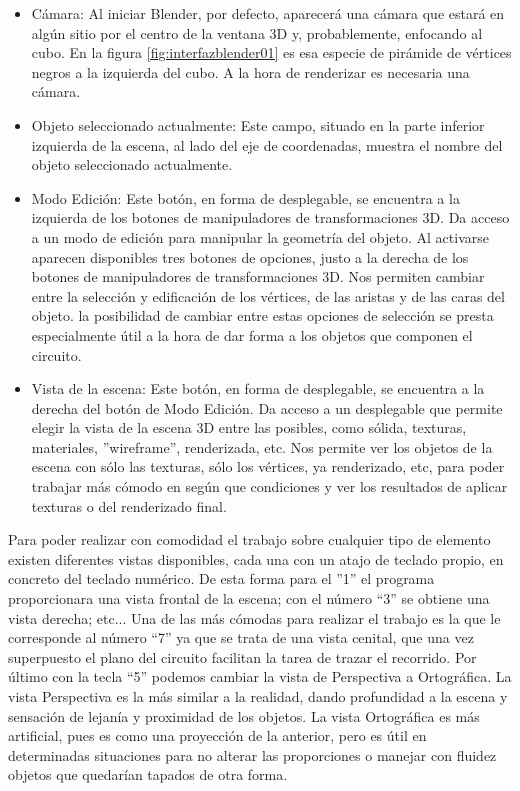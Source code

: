 \begin{itemize}
	\item Cámara: Al iniciar Blender, por defecto, aparecerá una cámara que estará en algún sitio por el centro de la ventana 3D y, probablemente, enfocando al cubo. En la figura \ref{fig:interfazblender01} es esa especie de pirámide de vértices negros a la izquierda del cubo. A la hora de renderizar es necesaria una cámara.
	
	\item Objeto seleccionado actualmente: Este campo, situado en la parte inferior izquierda de la escena, al lado del eje de coordenadas, muestra el  nombre del objeto seleccionado actualmente.
	
	\item Modo Edición: Este botón, en forma de desplegable, se encuentra a la izquierda de los botones de manipuladores de transformaciones 3D. Da acceso a un modo de edición para manipular la geometría del objeto. Al activarse aparecen disponibles tres botones de opciones, justo a la derecha de los botones de manipuladores de transformaciones 3D. Nos permiten cambiar entre la selección y edificación de los vértices, de las aristas y de las caras del objeto. la posibilidad de cambiar entre estas opciones de selección se presta especialmente útil a la hora de dar forma a los objetos que componen el circuito.
	
	\item Vista de la escena: Este botón, en forma de desplegable, se encuentra a la derecha del botón de Modo Edición. Da acceso a un desplegable que permite elegir la vista de la escena 3D entre las posibles, como sólida, texturas, materiales, ”wireframe”, renderizada, etc. Nos permite ver los objetos de la escena con sólo las texturas, sólo los vértices, ya renderizado, etc, para poder trabajar más cómodo en según que condiciones y ver los resultados de aplicar texturas o del renderizado final.
	
\end{itemize}

Para poder realizar con comodidad el trabajo sobre cualquier tipo de elemento existen diferentes vistas disponibles, cada una con un atajo de teclado propio, en concreto del teclado numérico. De esta forma para el ”1” el programa proporcionara una vista frontal de la escena; con el número “3” se obtiene una vista derecha; etc... Una de las más cómodas para realizar el trabajo es la que le corresponde al número “7” ya que se trata de una vista cenital, que una vez superpuesto el plano del circuito facilitan la tarea de trazar el recorrido. Por último con la tecla “5” podemos cambiar la vista de Perspectiva a Ortográfica. La vista Perspectiva es la más similar a la realidad, dando profundidad a la escena y sensación de lejanía y proximidad de los objetos. La vista Ortográfica es más artificial, pues es como una proyección de la anterior, pero es útil en determinadas situaciones para no alterar las proporciones o manejar con fluidez objetos que quedarían tapados de otra forma.


